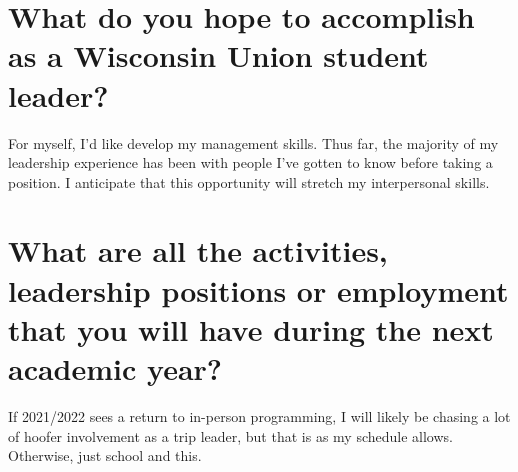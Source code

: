 \documentclass[12pt]{article}
\begin{document}
\section{What do you hope to accomplish as a Wisconsin Union student leader?}

    For myself, I'd like develop my management skills. Thus far, the majority of my leadership experience has been with people I've gotten to know before taking a position.  I anticipate that this opportunity will stretch my interpersonal skills.

\section{What are all the activities, leadership positions or employment that you will have during the next academic year?}

    If 2021/2022 sees a return to in-person programming, I will likely be chasing a lot of hoofer involvement as a trip leader, but that is as my schedule allows. Otherwise, just school and this.
\end{document}
